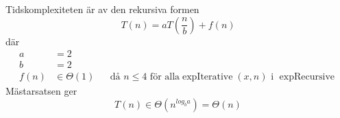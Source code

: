 \documentclass{article}
\begin{document}
Tidskomplexiteten är av den rekursiva formen
\[ T(n) = aT\left(\frac{n}{b}\right) + f(n) \]
där
\begin{align*}
a    & = 2 \\
b    & = 2 \\
f(n) & \in \Theta(1) && \text{då $n \leq 4$ för alla
$\operatorname{expIterative}(x, n)$ i $\operatorname{expRecursive}$}
\end{align*}
Mästarsatsen ger
\[ T(n) \in \Theta(n^{log_b a}) = \Theta(n) \]
\end{document}

